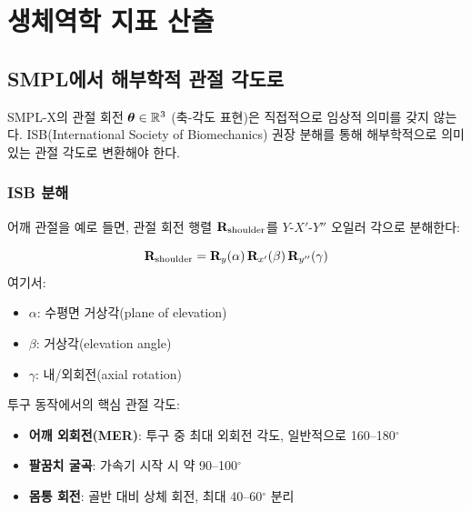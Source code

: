 \documentclass[11pt, a4paper]{report}
\begin{document}
\chapter{생체역학 지표 산출}

\section{SMPL에서 해부학적 관절 각도로}

SMPL-X의 관절 회전 $\bm{\theta} \in \mathbb{R}^{3}$ (축-각도 표현)은 직접적으로 임상적 의미를 갖지 않는다.
ISB(International Society of Biomechanics) 권장 분해를 통해
해부학적으로 의미 있는 관절 각도로 변환해야 한다.

\subsection{ISB 분해}

어깨 관절을 예로 들면, 관절 회전 행렬 $\mathbf{R}_{\text{shoulder}}$를
$Y$-$X'$-$Y''$ 오일러 각으로 분해한다:

\begin{equation}
  \mathbf{R}_{\text{shoulder}} = \mathbf{R}_y(\alpha) \, \mathbf{R}_{x'}(\beta) \, \mathbf{R}_{y''}(\gamma)
\end{equation}
여기서:
\begin{itemize}[nosep]
  \item $\alpha$: 수평면 거상각(plane of elevation)
  \item $\beta$: 거상각(elevation angle)
  \item $\gamma$: 내/외회전(axial rotation)
\end{itemize}

\begin{biomechbox}
투구 동작에서의 핵심 관절 각도:
\begin{itemize}[nosep]
  \item \textbf{어깨 외회전(MER)}: 투구 중 최대 외회전 각도, 일반적으로 160--180$^\circ$
  \item \textbf{팔꿈치 굴곡}: 가속기 시작 시 약 90--100$^\circ$
  \item \textbf{몸통 회전}: 골반 대비 상체 회전, 최대 40--60$^\circ$ 분리
\end{itemize}
\end{biomechbox}
\end{document}
